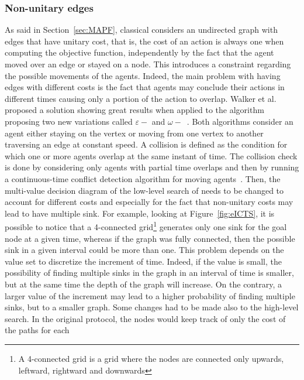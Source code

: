 \subsubsection{Non-unitary edges}
As said in Section~\ref{sec:MAPF}, classical  considers an
undirected graph with edges that have unitary cost, that is, the cost of an
action is always one when computing the objective function, independently by
the fact that the agent moved over an edge or stayed on a node. This introduces
a constraint regarding the possible movements of the agents. Indeed, the main
problem with having edges with different costs is the fact that agents may
conclude their actions in different times causing only a portion of the action
to overlap. Walker et al. proposed a solution showing great results when
applied to the  algorithm proposing two new variations called
$\varepsilon-$ and $\omega-$~\cite{EICTS}. \newline
Both algorithms consider an agent either staying on the vertex or moving from
one vertex to another traversing an edge at constant speed. A collision is
defined as the condition for which one or more agents overlap at the same
instant of time. The collision check is done by considering only agents with
partial time overlaps and then by running a continuous-time conflict detection
algorithm for moving agents~\cite{collision_detection}. \newline
Then, the multi-value decision diagram of the low-level search of 
needs to be changed to account for different costs and especially for the fact
that non-unitary costs may lead to have multiple sink. For example, looking at
Figure~\ref{fig:eICTS}, it is possible to notice that a 4-connected
grid\footnote{A 4-connected grid is a grid where the nodes are connected only
upwards, leftward, rightward and downwards} generates only one sink for the
goal node at a given time, whereas if the graph was fully connected, then the
possible sink in a given interval could be more than one. This problem depends
on the value set to discretize the increment of time. Indeed, if the value is
small, the possibility of finding multiple sinks in the graph in an interval of
time is smaller, but at the same time the depth of the graph will increase. On
the contrary, a larger value of the increment may lead to a higher probability
of finding multiple sinks, but to a smaller graph. \newline
Some changes had to be made also to the high-level search. In the original
protocol, the nodes would keep track of only the cost of the paths for each
